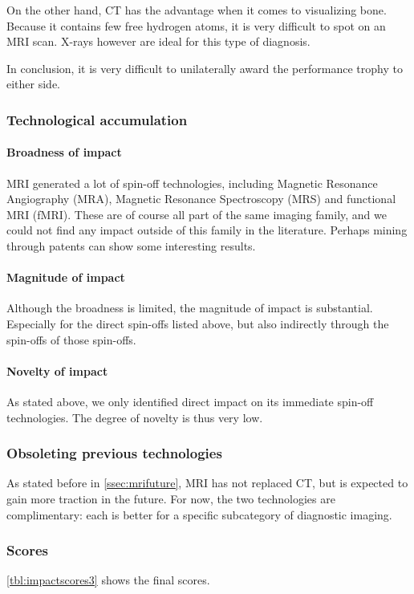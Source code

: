 On the other hand, CT has the advantage when it comes to visualizing bone.
Because it contains few free hydrogen atoms, it is very difficult to spot on an
MRI scan. X-rays however are ideal for this type of diagnosis.

In conclusion, it is very difficult to unilaterally award the performance
trophy to either side. 

\subsubsection{Technological accumulation}
\paragraph{Broadness of impact}
MRI generated a lot of spin-off technologies, including Magnetic Resonance
Angiography (MRA), Magnetic Resonance Spectroscopy (MRS) and functional MRI
(fMRI). These are of course all part of the same imaging family, and we could
not find any impact outside of this family in the literature. Perhaps
mining through patents can show some interesting results. 

\paragraph{Magnitude of impact}
Although the broadness is limited, the magnitude of impact is substantial.
Especially for the direct spin-offs listed above, but also indirectly through
the spin-offs of those spin-offs.

\paragraph{Novelty of impact}
As stated above, we only identified direct impact on its immediate spin-off
technologies. The degree of novelty is thus very low.

\subsubsection{Obsoleting previous technologies}
As stated before in \autoref{ssec:mrifuture}, MRI has not replaced CT, but is
expected to gain more traction in the future. For now, the two technologies are
complimentary: each is better for a specific subcategory of diagnostic imaging. 

\subsubsection{Scores}
\autoref{tbl:impactscores3} shows the final scores.

